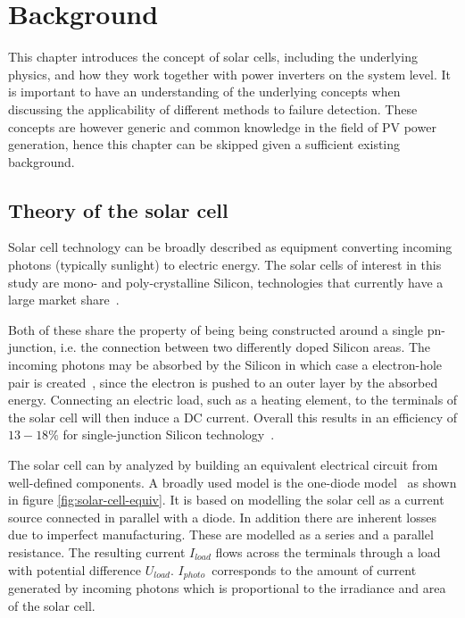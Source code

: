 \chapter{Background}
This chapter introduces the concept of solar cells, including the underlying physics,
and how they work together with power inverters on the system level.
It is important to have an understanding of the underlying concepts when discussing the applicability of different methods to failure detection.
These concepts are however generic and common knowledge in the field of PV power generation, 
hence this chapter can be skipped given a sufficient existing background.

\section{Theory of the solar cell}
Solar cell technology can be broadly described as equipment converting incoming photons (typically sunlight) to electric energy.
The solar cells of interest in this study are mono- and poly-crystalline Silicon, technologies that currently have a large market share~\cite{Zhao2010thesis}.

Both of these share the property of being being constructed around a single pn-junction, i.e. the connection between two differently doped Silicon areas.
The incoming photons may be absorbed by the Silicon in which case a electron-hole pair is created~\cite{Zhao2010thesis}, since the electron is pushed to an outer layer by the absorbed energy.
Connecting an electric load, such as a heating element, to the terminals of the solar cell will then induce a DC current.
Overall this results in an efficiency of $13-18\%$ for single-junction Silicon technology~\cite{Zhao2010thesis}.

The solar cell can by analyzed by building an equivalent electrical circuit from well-defined components.
A broadly used model is the one-diode model~\cite{Walker2001} as shown in figure \ref{fig:solar-cell-equiv}.
It is based on modelling the solar cell as a current source connected in parallel with a diode.
In addition there are inherent losses due to imperfect manufacturing.
These are modelled as a series and a parallel resistance.
The resulting current $I_{load}$ flows across the terminals through a load with potential difference $U_{load}$.
$I_{photo}$ corresponds to the amount of current generated by incoming photons which is proportional to the irradiance and area of the solar cell.

